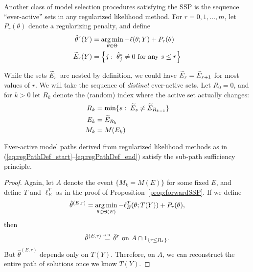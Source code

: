 \documentclass{article}
\begin{document}
Another class of model selection procedures satisfying the SSP is the sequence ``ever-active'' sets in any regularized likelihood method. For $r=0,1,\ldots,m$, let $P_r(\theta)$ denote a regularizing penalty, and define
\begin{align}\label{eq:regPathDef_start}
  \hat\theta^{r}(Y) &= 
  \operatorname*{arg\,min}_{\theta\in\Theta} -\ell(\theta; Y) + P_r(\theta) \\
  \widetilde{E}_r(Y) &= \left\{j:\; \hat\theta_j^s \neq 0 
    \text{ for any } s \leq r \right\}
\end{align}

While the sets $\widetilde{E}_r$ are nested by definition, we could have $\widetilde{E}_r = \widetilde{E}_{r+1}$ for most values of $r$. We will take the sequence of {\em distinct} ever-active sets. Let $R_0=0$, and for $k>0$ let $R_k$ denote the (random) index where the active set actually changes:
\begin{align}
  R_k &= \min\{s:\; \widetilde{E}_s \neq \widetilde{E}_{R_{k-1}}\}\\
  E_k &= \widetilde{E}_{R_k}\\
  \label{eq:regPathDef_end}
  M_k &= M(E_k)
\end{align}

\begin{proposition}\label{prop:regPathSSP}
Ever-active model paths derived from regularized likelihood methods as in (\ref{eq:regPathDef_start}--\ref{eq:regPathDef_end}) satisfy the sub-path sufficiency principle.
\end{proposition}

\begin{proof}
  Again, let $A$ denote the event $\{M_k = M(E)\}$ for some fixed $E$, and define $T$ and $\ell_E^T$ as in the proof of Proposition~\ref{prop:forwardSSP}. If we define
\[
\hat\theta^{(E,r)} = \operatorname*{arg\,min}_{\theta\in\Theta(E)} -\ell_E^T(\theta; T(Y)) + P_r(\theta),
\]
then 
\[
\hat\theta^{(E,r)} \overset{\textrm{a.s.}}{=} \hat\theta^{r} \text{ on } 
A \cap 1_{\{r \leq R_k\}}.
\]
But $\hat\theta^{(E,r)}$ depends only on $T(Y)$. Therefore, on $A$, we can reconstruct the entire path of solutions once we know $T(Y)$.
\end{proof}

\end{document}
